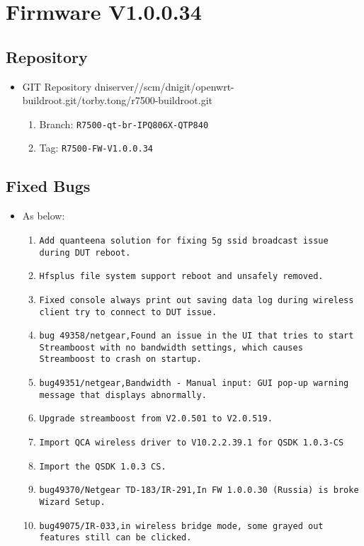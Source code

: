 \documentclass[12pt]{report}
\newcommand{\tlabel}[1]{
  \label{#1}%
  }
\begin{document}
\section{Firmware V1.0.0.34}

\tlabel{sec:1-0-1}
\subsection{Repository}
\begin{itemize}
	\item GIT Repository dniserver//scm/dnigit/openwrt-buildroot.git/torby.tong/r7500-buildroot.git
	\begin{enumerate}
		\item Branch: \texttt{R7500-qt-br-IPQ806X-QTP840}
                \item Tag: \texttt{R7500-FW-V1.0.0.34}
	\end{enumerate}
\end{itemize}

    \subsection{Fixed Bugs}
    \begin{itemize}
    \item As below:
    	\begin{enumerate}
		\item \texttt{Add quanteena solution for fixing 5g ssid broadcast issue during DUT reboot.}
		\item \texttt{Hfsplus file system support reboot and unsafely removed.}
		\item \texttt{Fixed console always print out saving data log during wireless client try to connect to DUT issue.}
		\item \texttt{bug 49358/netgear,Found an issue in the UI that tries to start Streamboost with no bandwidth settings, which causes Streamboost to crash on startup.}
		\item \texttt{bug49351/netgear,Bandwidth - Manual input: GUI pop-up warning message that displays abnormally.}
		\item \texttt{Upgrade streamboost from V2.0.501 to V2.0.519.}
		\item \texttt{Import QCA wireless driver to V10.2.2.39.1 for QSDK 1.0.3-CS}
		\item \texttt{Import the QSDK 1.0.3 CS.}
		\item \texttt{bug49370/Netgear TD-183/IR-291,In FW 1.0.0.30 (Russia) is broke Wizard Setup.}
		\item \texttt{bug49075/IR-033,in wireless bridge mode, some grayed out features still can be clicked.}
    	\end{enumerate}
    \end{itemize}
\end{document}
